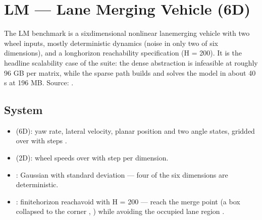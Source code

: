 \documentclass[a4paper,10pt,english]{sphinxmanual}
\begin{document}
\sphinxstepscope


\section{LM — Lane Merging Vehicle (6D)}
\label{\detokenize{benchmarks/LM:lm-lane-merging-vehicle-6d}}\label{\detokenize{benchmarks/LM::doc}}
\sphinxAtStartPar
The LM benchmark is a six\sphinxhyphen{}dimensional nonlinear lane\sphinxhyphen{}merging vehicle with two wheel
inputs, mostly deterministic dynamics (noise in only two of six dimensions), and a
long\sphinxhyphen{}horizon reachability specification (H = 200). It is the headline scalability
case of the suite: the dense abstraction is infeasible at roughly 96 GB per matrix,
while the sparse path builds and solves the model in about 40 s at 196 MB. Source:
.


\subsection{System}
\label{\detokenize{benchmarks/LM:system}}\begin{itemize}
\item {} 
\sphinxAtStartPar
{} (6D): yaw rate, lateral velocity, planar position and two angle states,
gridded over  with steps .

\item {} 
\sphinxAtStartPar
{} (2D): wheel speeds over  with step  per
dimension.

\item {} 
\sphinxAtStartPar
{}: Gaussian with standard deviation  — four of
the six dimensions are deterministic.

\item {} 
\sphinxAtStartPar
{}: finite\sphinxhyphen{}horizon reach\sphinxhyphen{}avoid with H = 200 — reach the merge point
(a box collapsed to the corner , ) while avoiding the occupied
lane region .

\end{itemize}
\end{document}
